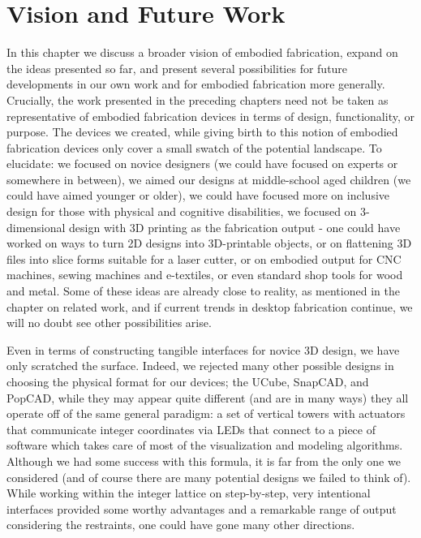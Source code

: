 \chapter{Vision and Future Work}
\label{vision}

In this chapter we discuss a broader vision of embodied fabrication, expand on
the ideas presented so far, and present several possibilities for future
developments in our own work and for embodied fabrication more generally.
Crucially, the work presented in the preceding chapters need not be
taken as representative of embodied fabrication devices in terms of design,
functionality, or purpose. The devices we created, while giving birth to this
notion of embodied fabrication devices only cover a small swatch of the
potential landscape. To elucidate: we focused on novice designers (we could have
focused on experts or somewhere in between), we aimed our designs at
middle-school aged children (we could have aimed younger or older), we could
have focused more on inclusive design for those with physical and cognitive
disabilities, we focused on 3-dimensional design with 3D printing as the
fabrication output - one could have worked on ways to turn 2D designs into
3D-printable objects, or on flattening 3D files into slice forms suitable for a
laser cutter, or on embodied output for CNC machines, sewing machines and
e-textiles, or even standard shop tools for wood and metal. Some of these ideas
are already close to reality, as mentioned in the chapter on related work, and
if current trends in desktop fabrication continue, we will no doubt see other
possibilities arise.

Even in terms of constructing tangible interfaces for novice 3D design, we have
only scratched the surface. Indeed, we rejected many other possible designs in
choosing the physical format for our devices; the UCube, SnapCAD, and PopCAD,
while they may appear quite different (and are in many ways) they all operate
off of the same general paradigm: a set of vertical towers with actuators that
communicate integer coordinates via LEDs that connect to a piece of software
which takes care of most of the visualization and modeling algorithms. Although
we had some success with this formula, it is far from the only one we considered
(and of course there are many potential designs we failed to think of). While
working within the integer lattice on step-by-step, very intentional interfaces
provided some worthy advantages and a remarkable range of output considering the
restraints, one could have gone many other directions.

